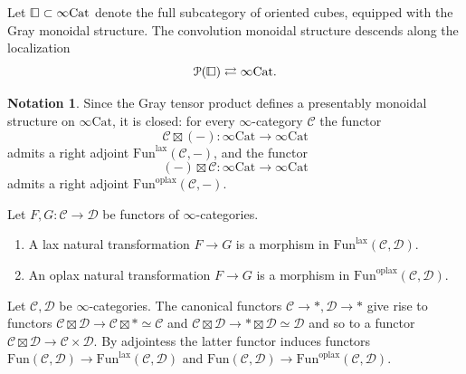 \documentclass[10pt,oneside]{article}
\numberwithin{equation}{section} %
\numberwithin{figure}{section} %
\theoremstyle{plain}
\theoremstyle{definition}
\newtheorem{notation}[thm]{Notation}
\newcommand{\mC}{{\mathcal C}}
\newcommand{\mD}{{\mathcal D}}
\newcommand{\mP}{{\mathcal P}}
\newcommand{\F}{{F}}
\newcommand{\G}{{G}}
\newcommand{\Cat}{\mathrm{Cat}}
\newcommand{\Fun}{\mathrm{Fun}}
\newcommand{\lax}{{\mathrm{lax}}}
\newcommand{\oplax}{{\mathrm{oplax}}}
\newcommand{\cube}{{\,\vline\negmedspace\square}}
\begin{document}
\begin{corollary}\label{locmon2}
Let $\cube \subset \infty\Cat$ denote the full subcategory of oriented cubes, equipped with the Gray monoidal structure.
The convolution monoidal structure descends along 
the localization $$\mP(\cube) \rightleftarrows \infty\Cat.$$

\end{corollary}


\begin{notation}
	
Since the Gray tensor product defines a presentably monoidal structure on $\infty\Cat$, it is closed: for every $\infty$-category $\mC$ the functor $$ \mC \boxtimes (-): \infty\Cat \to \infty\Cat$$ admits a right adjoint $\Fun^\lax(\mC,-)$, and the functor $$ (-) \boxtimes \mC : \infty\Cat \to \infty\Cat$$ admits a right adjoint $\Fun^\oplax(\mC,-)$.
\end{notation}

\begin{definition}Let $\F,\G:\mC \to \mD $ be functors of $\infty$-categories.
\begin{enumerate}[\normalfont(1)]\setlength{\itemsep}{-2pt}
\item A lax natural transformation $\F \to \G$ is a morphism in $\Fun^\lax(\mC,\mD)$.

\item An oplax natural transformation $\F \to \G$ is a morphism in $\Fun^\oplax(\mC,\mD)$.
\end{enumerate}
\end{definition}

\begin{remark}\label{funcompa}
	
Let $\mC,\mD$ be $\infty$-categories. The canonical functors $\mC \to *, \mD \to *$
give rise to functors $\mC \boxtimes \mD \to \mC \boxtimes * \simeq \mC$ and $\mC \boxtimes \mD \to * \boxtimes \mD \simeq \mD$ and so to a functor $\mC \boxtimes \mD \to \mC \times \mD.$
By adjointess the latter functor induces functors
$ \Fun(\mC,\mD)\to \Fun^\lax(\mC,\mD)$ and $\Fun(\mC,\mD)\to \Fun^\oplax(\mC,\mD).$
\end{remark}
\end{document}
